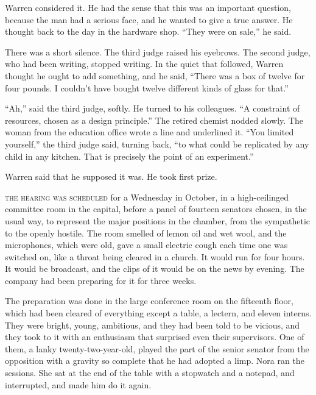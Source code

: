 Warren considered it. He had the sense that this was an important question, because the man had a serious face, and he wanted to give a true answer. He thought back to the day in the hardware shop. ``They were on sale,'' he said.

There was a short silence. The third judge raised his eyebrows. The second judge, who had been writing, stopped writing. In the quiet that followed, Warren thought he ought to add something, and he said, ``There was a box of twelve for four pounds. I couldn't have bought twelve different kinds of glass for that.''

``Ah,'' said the third judge, softly. He turned to his colleagues. ``A constraint of resources, chosen as a design principle.'' The retired chemist nodded slowly. The woman from the education office wrote a line and underlined it. ``You limited yourself,'' the third judge said, turning back, ``to what could be replicated by any child in any kitchen. That is precisely the point of an experiment.''

Warren said that he supposed it was. He took first prize.


\textsc{the hearing was scheduled} for a Wednesday in October, in a high-ceilinged committee room in the capital, before a panel of fourteen senators chosen, in the usual way, to represent the major positions in the chamber, from the sympathetic to the openly hostile. The room smelled of lemon oil and wet wool, and the microphones, which were old, gave a small electric cough each time one was switched on, like a throat being cleared in a church. It would run for four hours. It would be broadcast, and the clips of it would be on the news by evening. The company had been preparing for it for three weeks.

The preparation was done in the large conference room on the fifteenth floor, which had been cleared of everything except a table, a lectern, and eleven interns. They were bright, young, ambitious, and they had been told to be vicious, and they took to it with an enthusiasm that surprised even their supervisors. One of them, a lanky twenty-two-year-old, played the part of the senior senator from the opposition with a gravity so complete that he had adopted a limp. Nora ran the sessions. She sat at the end of the table with a stopwatch and a notepad, and interrupted, and made him do it again.

